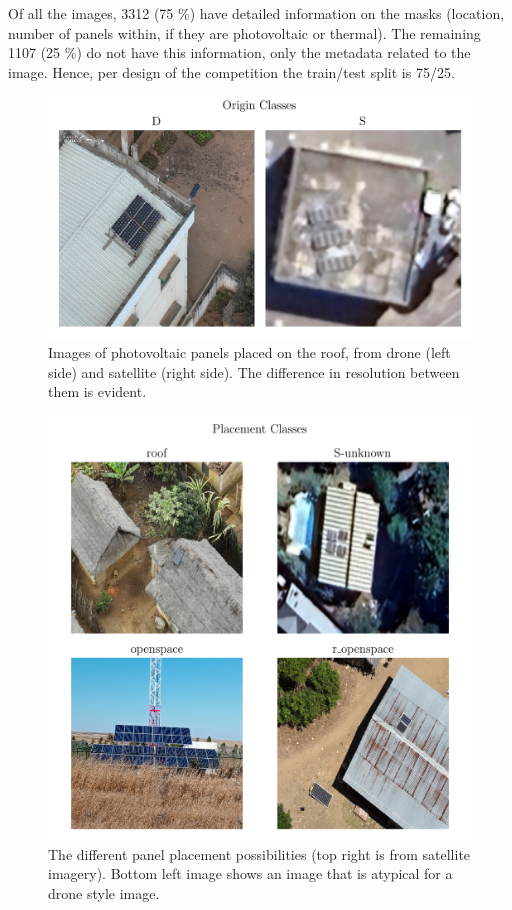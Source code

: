 \documentclass[conference]{IEEEtran}
\begin{document}
Of all the images, 3312 (75 \%) have detailed information on the masks (location, number of panels within, if they are photovoltaic or thermal). The remaining 1107 (25 \%) do not have this information, only the metadata related to the image. Hence, per design of the competition the train/test split is 75/25.

\begin{figure}[H]
    \centering
    \includegraphics[width=1\linewidth]{assets/data_origin_classes.png}
    \caption{Images of photovoltaic panels placed on the roof, from drone (left side) and satellite (right side). The difference in resolution between them is evident.}
    \label{fig:data_origin_classes}
\end{figure}

\begin{figure}[H]
    \centering
    \includegraphics[width=1\linewidth]{assets/data_placement_classes.png}
    \caption{The different panel placement possibilities (top right is from satellite imagery). Bottom left image shows an image that is atypical for a drone style image.}
    \label{fig:data_placement_classes}
\end{figure}
\end{document}
